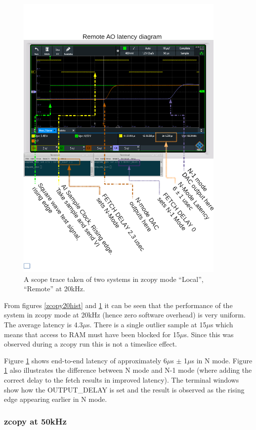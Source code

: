 \documentclass{article}
\begin{document}
\begin{figure} [htb!]
	\centering
	\includegraphics[width=4.0in]{images/20kHz_annotated_scope-p-2.png}
	\caption{A scope trace taken of two systems in zcopy mode “Local”, “Remote” at 20kHz.}
	\label{zcopy20scope}
\end{figure}

From figures \ref{zcopy20hist} and \ref{zcopy20scope} it can be seen that the performance of the system in zcopy mode at 20kHz (hence zero software overhead) is very uniform.
The average latency is 4.3$\mu$s.
There is a single outlier sample at 15$\mu$s which means that access to RAM must have been blocked for 15$\mu$s.
Since this was observed during a zcopy run this is not a timeslice effect.

Figure \ref{zcopy20scope} shows end-to-end latency of approximately 6$\mu$s $\pm$ 1$\mu$s in N mode.
Figure \ref{zcopy20scope} also illustrates the difference between N mode and N-1 mode (where adding the correct delay to the fetch results in improved latency).
The terminal windows show how the OUTPUT\_DELAY is set and the result is observed as the rising edge appearing earlier in N mode.

\subsubsection{zcopy at 50kHz}
\end{document}
